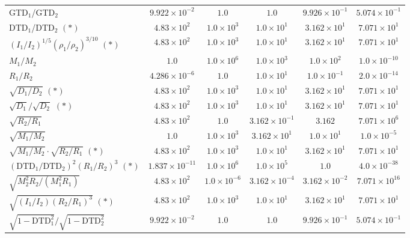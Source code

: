 \begin{table}[ht]
\begin{tabular}{@{} l c c c c c @{}}
GTD$_1$/GTD$_2$ & $9.922 \times 10^{-2}$ & $1.0$ & $1.0$ & $9.926 \times 10^{-1}$ & $5.074 \times 10^{-1}$ \\
DTD$_1$/DTD$_2$ $(\ast)$ & $4.83 \times 10^{2}$ & $1.0 \times 10^{3}$ & $1.0 \times 10^{1}$ & $3.162 \times 10^{1}$ & $7.071 \times 10^{1}$ \\
$(I_1/I_2)^{1/5}(\rho_1/\rho_2)^{3/10}$ $(\ast)$ & $4.83 \times 10^{2}$ & $1.0 \times 10^{3}$ & $1.0 \times 10^{1}$ & $3.162 \times 10^{1}$ & $7.071 \times 10^{1}$ \\
$M_1/M_2$ & $1.0$ & $1.0 \times 10^{6}$ & $1.0 \times 10^{3}$ & $1.0 \times 10^{2}$ & $1.0 \times 10^{-10}$ \\
$R_1/R_2$ & $4.286 \times 10^{-6}$ & $1.0$ & $1.0 \times 10^{1}$ & $1.0 \times 10^{-1}$ & $2.0 \times 10^{-14}$ \\
$\sqrt{D_1/D_2}$ $(\ast)$ & $4.83 \times 10^{2}$ & $1.0 \times 10^{3}$ & $1.0 \times 10^{1}$ & $3.162 \times 10^{1}$ & $7.071 \times 10^{1}$ \\
$\sqrt{D_1}/\sqrt{D_2}$ $(\ast)$ & $4.83 \times 10^{2}$ & $1.0 \times 10^{3}$ & $1.0 \times 10^{1}$ & $3.162 \times 10^{1}$ & $7.071 \times 10^{1}$ \\
$\sqrt{R_2/R_1}$ & $4.83 \times 10^{2}$ & $1.0$ & $3.162 \times 10^{-1}$ & $3.162$ & $7.071 \times 10^{6}$ \\
$\sqrt{M_1/M_2}$ & $1.0$ & $1.0 \times 10^{3}$ & $3.162 \times 10^{1}$ & $1.0 \times 10^{1}$ & $1.0 \times 10^{-5}$ \\
$\sqrt{M_1/M_2} \cdot \sqrt{R_2/R_1}$ $(\ast)$ & $4.83 \times 10^{2}$ & $1.0 \times 10^{3}$ & $1.0 \times 10^{1}$ & $3.162 \times 10^{1}$ & $7.071 \times 10^{1}$ \\
$(\text{DTD}_1/\text{DTD}_2)^2(R_1/R_2)^3$ $(\ast)$ & $1.837 \times 10^{-11}$ & $1.0 \times 10^{6}$ & $1.0 \times 10^{5}$ & $1.0$ & $4.0 \times 10^{-38}$ \\
$\sqrt{M_2^2 R_2/(M_1^2 R_1)}$ & $4.83 \times 10^{2}$ & $1.0 \times 10^{-6}$ & $3.162 \times 10^{-4}$ & $3.162 \times 10^{-2}$ & $7.071 \times 10^{16}$ \\
$\sqrt{(I_1/I_2)(R_2/R_1)^3}$ $(\ast)$ & $4.83 \times 10^{2}$ & $1.0 \times 10^{3}$ & $1.0 \times 10^{1}$ & $3.162 \times 10^{1}$ & $7.071 \times 10^{1}$ \\
$\sqrt{1-\text{DTD}_1^2}/\sqrt{1-\text{DTD}_2^2}$ & $9.922 \times 10^{-2}$ & $1.0$ & $1.0$ & $9.926 \times 10^{-1}$ & $5.074 \times 10^{-1}$ \\
\bottomrule
\end{tabular}
\end{table}

